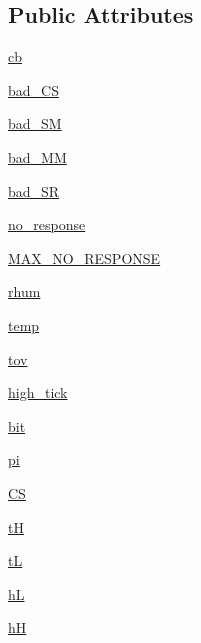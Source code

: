\subsection*{Public Attributes}
\begin{DoxyCompactItemize}
\item 
\hyperlink{classconcretesensor_1_1dht22Humidity_1_1DHT22Humidity_afea06a78ca5826ebfbbd26ee827e7e9e}{cb}
\item 
\hyperlink{classconcretesensor_1_1dht22Humidity_1_1DHT22Humidity_aec6e3a86391ba28ad1f2320218f05848}{bad\+\_\+\+C\+S}
\item 
\hyperlink{classconcretesensor_1_1dht22Humidity_1_1DHT22Humidity_a827a1bd9ffb9bfa27799eba427f0a6ee}{bad\+\_\+\+S\+M}
\item 
\hyperlink{classconcretesensor_1_1dht22Humidity_1_1DHT22Humidity_afc57e0d276003aea449c6b2259bc7c75}{bad\+\_\+\+M\+M}
\item 
\hyperlink{classconcretesensor_1_1dht22Humidity_1_1DHT22Humidity_a4db9004023046a92f0c632d96932ec8b}{bad\+\_\+\+S\+R}
\item 
\hyperlink{classconcretesensor_1_1dht22Humidity_1_1DHT22Humidity_ab3d17e90dd6a7874fd067a142a23d878}{no\+\_\+response}
\item 
\hyperlink{classconcretesensor_1_1dht22Humidity_1_1DHT22Humidity_a5054f532275aaf25f1c1e652c5e7671d}{M\+A\+X\+\_\+\+N\+O\+\_\+\+R\+E\+S\+P\+O\+N\+S\+E}
\item 
\hyperlink{classconcretesensor_1_1dht22Humidity_1_1DHT22Humidity_ae1b8d9e6236af1a19bd9f4e09d00563e}{rhum}
\item 
\hyperlink{classconcretesensor_1_1dht22Humidity_1_1DHT22Humidity_a712bc944f8c6aed80eb35d7906e5d708}{temp}
\item 
\hyperlink{classconcretesensor_1_1dht22Humidity_1_1DHT22Humidity_addc18bf7bbe4daff1b945c7266c9bf78}{tov}
\item 
\hyperlink{classconcretesensor_1_1dht22Humidity_1_1DHT22Humidity_a69417232bdfd90f89570bb8f51d7b260}{high\+\_\+tick}
\item 
\hyperlink{classconcretesensor_1_1dht22Humidity_1_1DHT22Humidity_a4eb5702b667e989311989e81110b5757}{bit}
\item 
\hyperlink{classconcretesensor_1_1dht22Humidity_1_1DHT22Humidity_a558bf0c0a1ad9be045d52fdb3767fb9f}{pi}
\item 
\hyperlink{classconcretesensor_1_1dht22Humidity_1_1DHT22Humidity_a0a900e4b9dbf8f9594fc4504d5ab7cf3}{C\+S}
\item 
\hyperlink{classconcretesensor_1_1dht22Humidity_1_1DHT22Humidity_af818d9463153efde45f9c82f8f8992fd}{t\+H}
\item 
\hyperlink{classconcretesensor_1_1dht22Humidity_1_1DHT22Humidity_a080741570bfe3eb9f95a04046d7e839c}{t\+L}
\item 
\hyperlink{classconcretesensor_1_1dht22Humidity_1_1DHT22Humidity_a89a784d4d52edf2e45df3b55d1f115bd}{h\+L}
\item 
\hyperlink{classconcretesensor_1_1dht22Humidity_1_1DHT22Humidity_a401a86d2e3093c806a98be43f94f6d02}{h\+H}
\end{DoxyCompactItemize}
